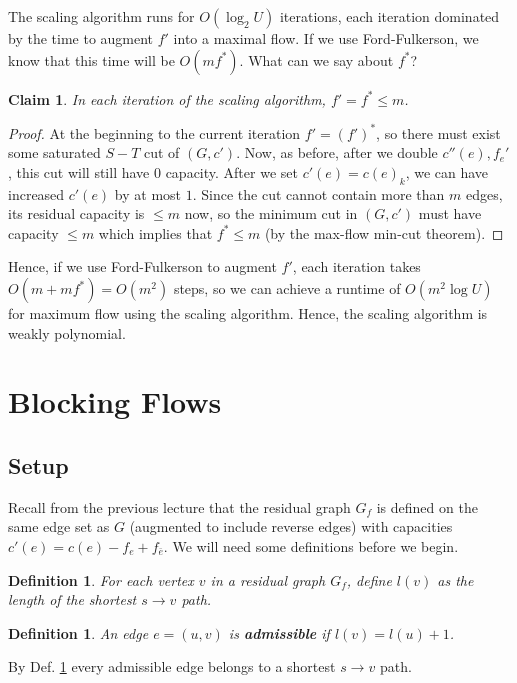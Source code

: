 \documentclass[11pt]{article}
\newtheorem{definition}[theorem]{Definition}
\newtheorem{claim}[theorem]{Claim}
\begin{document}
The scaling algorithm runs for $O(\log_2 U)$ iterations, each iteration dominated by the time to augment $f'$ into a maximal flow. If we use Ford-Fulkerson, we know that this time will be $O(m f^*)$. What can we say about $f^*$? 

\begin{claim}
In each iteration of the scaling algorithm, $f' = f^* \leq m$. 
\end{claim}

\begin{proof}
At the beginning to the current iteration $f' = (f')^*$, so there must exist some saturated $S-T$ cut of $(G, c')$. Now, as before, after we double $c''(e), f_e'$, this cut will still have 0 capacity. After we set $c'(e) = c(e)_k$, we can have increased $c'(e)$ by at most $1$. Since the cut cannot contain more than $m$ edges, its residual capacity is $\leq m$ now, so the minimum cut in $(G, c')$ must have capacity $\leq m$ which implies that $f^* \leq m$ (by the max-flow min-cut theorem). 
\end{proof}

Hence, if we use Ford-Fulkerson to augment $f'$, each iteration takes $O(m + m f^*) = O(m^2)$ steps, so we can achieve a runtime of $O(m^2\log U)$ for maximum flow using the scaling algorithm. Hence, the scaling algorithm is weakly polynomial. 

\section{Blocking Flows}

\subsection{Setup}
Recall from the previous lecture that the residual graph $G_f$ is defined on the same edge set as $G$ (augmented to include reverse edges) with capacities $c'(e) = c(e) - f_e + f_{\bar{e}}$. We will need some definitions before we begin. 

\begin{definition}
For each vertex $v$ in a residual graph $G_f$, define $l(v)$ as the length of the shortest $s \to v$ path.
\end{definition}

\begin{definition}\label{admissible}
An edge $e = (u, v)$ is \textbf{admissible} if $l(v) = l(u) + 1$. 
\end{definition}
By Def. \ref{admissible} every admissible edge belongs to a shortest $s \to v$ path.  
\end{document}
